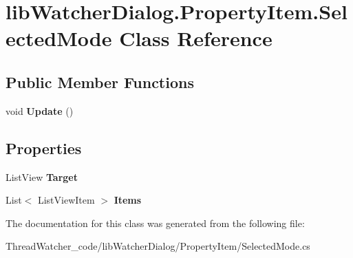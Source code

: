 \hypertarget{classlib_watcher_dialog_1_1_property_item_1_1_selected_mode}{\section{lib\+Watcher\+Dialog.\+Property\+Item.\+Selected\+Mode Class Reference}
\label{classlib_watcher_dialog_1_1_property_item_1_1_selected_mode}
}
\subsection*{Public Member Functions}
\begin{DoxyCompactItemize}
\item 
\hypertarget{classlib_watcher_dialog_1_1_property_item_1_1_selected_mode_a8d426e7a1c3d23a79f0f1af1cfd46d84}{void {\bfseries Update} ()}\label{classlib_watcher_dialog_1_1_property_item_1_1_selected_mode_a8d426e7a1c3d23a79f0f1af1cfd46d84}

\end{DoxyCompactItemize}
\subsection*{Properties}
\begin{DoxyCompactItemize}
\item 
\hypertarget{classlib_watcher_dialog_1_1_property_item_1_1_selected_mode_aa36c01325120e4667fa5c070a6a90677}{List\+View {\bfseries Target}}\label{classlib_watcher_dialog_1_1_property_item_1_1_selected_mode_aa36c01325120e4667fa5c070a6a90677}

\item 
\hypertarget{classlib_watcher_dialog_1_1_property_item_1_1_selected_mode_a55cb332bf8467035141d23b2ba7f174d}{List$<$ List\+View\+Item $>$ {\bfseries Items}}\label{classlib_watcher_dialog_1_1_property_item_1_1_selected_mode_a55cb332bf8467035141d23b2ba7f174d}

\end{DoxyCompactItemize}


The documentation for this class was generated from the following file\+:\begin{DoxyCompactItemize}
\item 
Thread\+Watcher\+\_\+code/lib\+Watcher\+Dialog/\+Property\+Item/Selected\+Mode.\+cs\end{DoxyCompactItemize}
